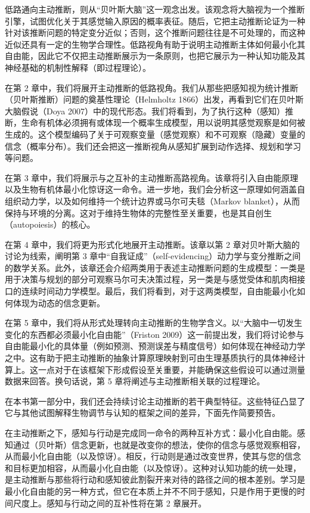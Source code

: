 低路通向主动推断，则从``贝叶斯大脑''这一观念出发。该观念将大脑视为一个推断引擎，试图优化关于其感觉输入原因的概率表征。随后，它把主动推断论证为一种针对该推断问题的特定变分近似；否则，这个推断问题往往是不可处理的，而这种近似还具有一定的生物学合理性。低路视角有助于说明主动推断主体如何最小化其自由能，因此它不仅把主动推断展示为一条原则，也把它展示为一种认知功能及其神经基础的机制性解释（即过程理论）。

在第 2 章中，我们将展开主动推断的低路视角。我们从那些把感知视为统计推断（贝叶斯推断）问题的奠基性理论（Helmholtz 1866）出发，再看到它们在贝叶斯大脑假说（Doya 2007）中的现代形态。我们将看到，为了执行这种（感知）推断，生命有机体必须拥有或体现一个概率生成模型，用以说明其感觉观察是如何被生成的。这个模型编码了关于可观察变量（感觉观察）和不可观察（隐藏）变量的信念（概率分布）。我们还会把这一推断视角从感知扩展到动作选择、规划和学习等问题。

在第 3 章中，我们将展示与之互补的主动推断高路视角。该章将引入自由能原理以及生物有机体最小化惊讶这一命令。进一步地，我们会分析这一原理如何涵盖自组织动力学，以及如何维持一个统计边界或马尔可夫毯（Markov blanket），从而保持与环境的分离。这对于维持生物体的完整性至关重要，也是其自创生（autopoiesis）的核心。

在第 4 章中，我们将更为形式化地展开主动推断。该章以第 2 章对贝叶斯大脑的讨论为线索，阐明第 3 章中``自我证成''（self-evidencing）动力学与变分推断之间的数学关系。此外，该章还会介绍两类用于表述主动推断问题的生成模型：一类是用于决策与规划的部分可观察马尔可夫决策过程，另一类是与感觉受体和肌肉相接口的连续时间动力学模型。最后，我们将看到，对于这两类模型，自由能最小化如何体现为动态的信念更新。

在第 5 章中，我们将从形式处理转向主动推断的生物学含义。以``大脑中一切发生变化的东西都必须最小化自由能''（Friston 2009）这一前提出发，我们将讨论参与自由能最小化的具体量（例如预测、预测误差与精度信号）如何体现在神经动力学之中。这有助于把主动推断的抽象计算原理映射到可由生理基质执行的具体神经计算上。这一点对于在该框架下形成假设至关重要，并能确保这些假设可以通过测量数据来回答。换句话说，第 5 章将阐述与主动推断相关联的过程理论。

在本书第一部分中，我们还会持续讨论主动推断的若干典型特征。这些特征凸显了它与其他试图解释生物调节与认知的框架之间的差异，下面先作简要预告。

在主动推断之下，感知与行动是完成同一命令的两种互补方式：最小化自由能。感知通过（贝叶斯）信念更新，也就是改变你的想法，使你的信念与感觉观察相容，从而最小化自由能（以及惊讶）。相反，行动则是通过改变世界，使其与您的信念和目标更加相容，从而最小化自由能（以及惊讶）。这种对认知功能的统一处理，是主动推断与那些将行动和感知彼此割裂开来对待的路径之间的根本差别。学习是最小化自由能的另一种方式，但它在本质上并不不同于感知，只是作用于更慢的时间尺度上。感知与行动之间的互补性将在第 2 章展开。

